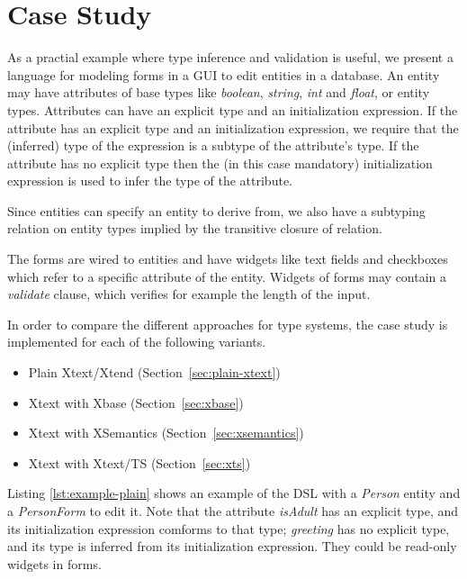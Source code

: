 \section{Case Study}
\label{sec:casestudy}

As a practial example where type inference and validation is useful, we present
a language for modeling forms in a GUI to edit entities in a database.  An
entity may have attributes of base types like \emph{boolean}, \emph{string},
\emph{int} and \emph{float}, or entity types.
Attributes can have an explicit type and an initialization expression.
If the attribute has an explicit type and an initialization expression, we
require that the (inferred) type of the expression is a subtype of the
attribute's type.  If the attribute has no explicit type then the (in this case
mandatory) initialization expression is used to infer the type of the attribute.

Since entities can specify an entity to derive from, we also have a subtyping
relation on entity types implied by the transitive closure of 
relation.

The forms are wired to entities and have widgets like text fields and
checkboxes which refer to a specific attribute of the entity.
Widgets of forms may contain a \emph{validate} clause, which verifies for
example the length of the input.

In order to compare the different approaches for type systems, the case study is
implemented for each of the following variants.

\begin{itemize}
\item Plain Xtext/Xtend (Section~\ref{sec:plain-xtext})
\item Xtext with Xbase (Section~\ref{sec:xbase})
\item Xtext with XSemantics (Section~\ref{sec:xsemantics})
\item Xtext with Xtext/TS (Section~\ref{sec:xts})
\end{itemize}

Listing \ref{lst:example-plain} shows an example of the DSL with a \emph{Person}
entity and a \emph{PersonForm} to edit it. Note that the attribute
\emph{isAdult} has an explicit type, and its initialization expression
comforms to that type; \emph{greeting} has no explicit type, and its type is
inferred from its initialization expression.
They could be read-only widgets in forms.

%

